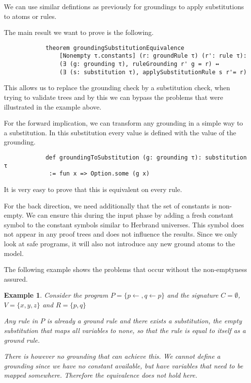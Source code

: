 \documentclass{article}
\newtheorem{example}{Example}
\begin{document}
            We can use similar defintions as previously for groundings to apply substitutions to atoms or rules.

            The main result we want to prove is the following.

            \begin{lstlisting}
            theorem groundingSubstitutionEquivalence 
                [Nonempty τ.constants] (r: groundRule τ) (r': rule τ):
                (∃ (g: grounding τ), ruleGrounding r' g = r) ↔ 
                (∃ (s: substitution τ), applySubstitutionRule s r'= r)
            \end{lstlisting}

            This allows us to replace the grounding check by a substitution check, when trying to validate trees and by this we can bypass the problems that were illustrated in the example above. 

            For the forward implication, we can transform any grounding in a simple way to a substitution. In this substitution every value is defined with the value of the grounding.

            \begin{lstlisting}
            def groundingToSubstitution (g: grounding τ): substitution τ
             := fun x => Option.some (g x)
            \end{lstlisting}

            It is very easy to prove that this is equivalent on every rule.

            For the back direction, we need additionally that the set of constants is non-empty. We can ensure this during the input phase by adding a fresh constant symbol to the constant symbols similar to Herbrand universes. This symbol does not appear in any proof trees and does not influence the results. Since we only look at safe programs, it will also not introduce any new ground atoms to the model.

            The following example shows the problems that occur without the non-emptyness assured.

            \begin{example}
                Consider the program $P= \{p \leftarrow, q \leftarrow p\}$ and the signature $C = \emptyset$, $V = \{x,y,z \}$ and $R = \{p,q\}$

                Any rule in $P$ is already a ground rule and there exists a substitution, the empty substitution that maps all variables to none, so that the rule is equal to itself as a ground rule.
                
                There is however no grounding that can achieve this. We cannot define a grounding since we have no constant available, but have variables that need to be mapped somewhere. Therefore the equivalence does not hold here.
            \end{example}
\end{document}
